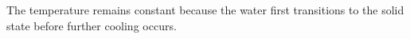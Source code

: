 The temperature remains constant because the water first transitions to the solid state before further cooling occurs.